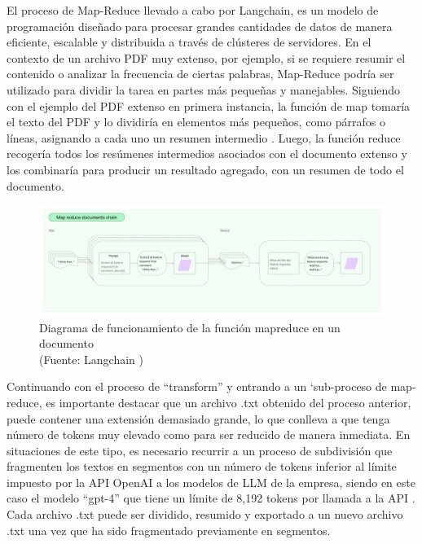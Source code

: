 \par El proceso de Map-Reduce llevado a cabo por Langchain, es un modelo de programación diseñado para procesar grandes cantidades de datos de manera eficiente, 
escalable y distribuida a través de clústeres de servidores. En el contexto de un archivo PDF muy extenso, por ejemplo, si se requiere resumir 
el contenido o analizar la frecuencia de ciertas palabras, Map-Reduce podría ser utilizado para dividir la tarea en partes más pequeñas y manejables. Siguiendo con el ejemplo del PDF extenso
en primera instancia, la función de map tomaría el texto del PDF y lo dividiría en elementos más pequeños, como párrafos o líneas, 
asignando a cada uno un resumen intermedio \cite{mapreduce}. Luego, la función reduce recogería todos los resúmenes intermedios asociados con el documento extenso
y los combinaría para producir un resultado agregado, con un resumen de todo el documento. 

\begin{figure}[ht!]
    \centering
    \includegraphics[width=1\textwidth]{figures/huemul_mapreduce.jpg}
    \caption[Diagrama de funcionamiento de la función mapreduce en un documento]{Diagrama de funcionamiento de la función mapreduce en un documento\\
    {\scriptsize (Fuente: Langchain \cite{framework1})}}
    \label{fig:chatbot1}
\end{figure}

\par Continuando con el proceso de ``transform'' y entrando a un `sub-proceso de map-reduce, es importante destacar que un archivo .txt obtenido del proceso anterior, 
puede contener una extensión demasiado grande, lo que conlleva a que tenga número de tokens muy elevado como para ser reducido de manera inmediata. 
En situaciones de este tipo, es necesario recurrir a un proceso de subdivisión que fragmenten los textos en segmentos con un número de tokens inferior al límite impuesto por 
la API OpenAI a los modelos de LLM de la empresa, siendo en este caso el modelo ``gpt-4'' que tiene un límite de 8,192 tokens por llamada a la API \cite{openaimodels}.
Cada archivo .txt puede ser dividido, resumido y exportado a un nuevo archivo .txt una vez que ha sido fragmentado previamente en segmentos.

